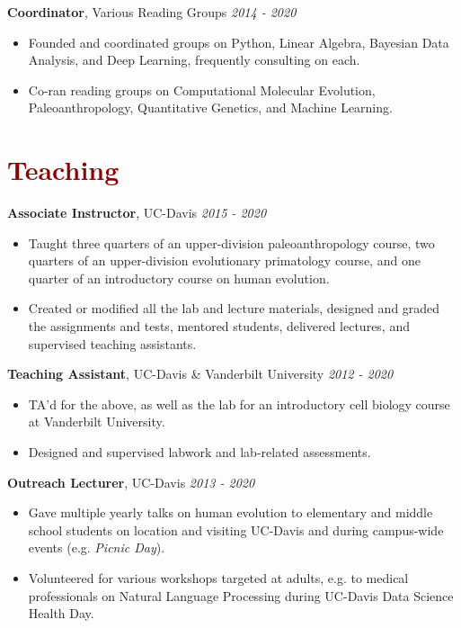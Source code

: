 \documentclass[11pt,margin,line]{resume}
\begin{document}
\begin{resume}
\textbf{Coordinator}, Various Reading Groups \hfill \emph{2014 - 2020}
\begin{itemize}[noitemsep]
\item Founded and coordinated groups on Python, Linear Algebra, Bayesian Data Analysis, and Deep Learning, frequently consulting on each. 
\item Co-ran reading groups on Computational Molecular Evolution, Paleoanthropology, Quantitative Genetics, and Machine Learning.
\end{itemize} 
\vspace{-1.5mm}

\section{\large\textcolor{DarkRed}{Teaching}}

\textbf{Associate Instructor}, UC-Davis \hfill \emph{2015  - 2020}
\begin{itemize}[noitemsep]
\item Taught three quarters of an upper-division paleoanthropology course, two quarters of an upper-division evolutionary primatology course, and one quarter of an introductory course on human evolution. 
\item Created or modified all the lab and lecture materials, designed and graded the assignments and tests, mentored students, delivered lectures, and supervised teaching assistants.
\end{itemize} 
\vspace{-1.5mm}

\textbf{Teaching Assistant}, UC-Davis \& Vanderbilt University \hfill \emph{2012  - 2020}
\begin{itemize}[noitemsep]
\item TA'd for the above, as well as the lab for an introductory cell biology course at Vanderbilt University. 
\item Designed and supervised labwork and lab-related assessments.
\end{itemize}
\vspace{-1.5mm}

\textbf{Outreach Lecturer}, UC-Davis \hfill \emph{2013  - 2020}\\
\begin{itemize}[noitemsep]
\vspace{-4.5mm} \item Gave multiple yearly talks on human evolution to elementary and middle school students on location and visiting UC-Davis and during campus-wide events (e.g. \emph{Picnic Day}). 
\item Volunteered for various workshops targeted at adults, e.g. to medical professionals on Natural Language Processing during UC-Davis Data Science Health Day.
\end{itemize}
\vspace{-1.5mm}


\end{resume}
\end{document}
